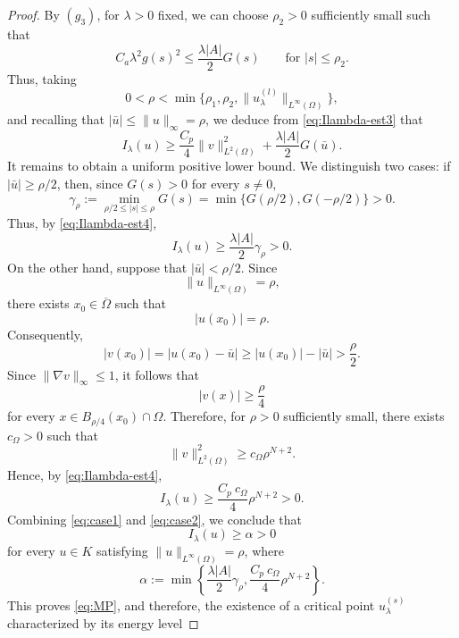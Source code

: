 \documentclass[11pt,reqno]{amsart}
\theoremstyle{plain}
\theoremstyle{definition}
\numberwithin{equation}{section}
\begin{document}
\begin{proof}
    By $(g_3)$, for $\lambda>0$ fixed, we can choose $\rho_2>0$ sufficiently small such that
    $$
        C_a\lambda^2g(s)^2
        \leq
        \frac{\lambda |A|}{2}G(s)
        \qquad\text{for } |s|\leq\rho_2.
    $$
    Thus, taking
    $$
        0<\rho<\min\{\rho_1,\rho_2, \|u_\lambda^{(l)}\|_{L^{\infty}(\Omega)}\},
    $$
    and recalling that $|\bar u|\leq\|u\|_\infty=\rho$, we deduce from
    \eqref{eq:Ilambda-est3} that
    \begin{equation}\label{eq:Ilambda-est4}
        I_\lambda(u)
        \geq
        \frac {C_p}4\|v\|_{L^2(\Omega)}^2
        +\frac{\lambda |A|}{2}G(\bar u).
    \end{equation}
    It remains to obtain a uniform positive lower bound. We distinguish
    two cases: if $|\bar u|\geq\rho/2$, then, since $G(s)>0$ for every $s\neq0$,
    $$
        \gamma_\rho:=
        \min_{\rho/2\leq |s|\leq\rho}G(s)= \min \{G(\rho/2), G(-\rho/2) \}>0.
    $$
    Thus, by \eqref{eq:Ilambda-est4},
    \begin{equation}\label{eq:case1}
        I_\lambda(u)
        \geq
        \frac{\lambda |A|}{2}\gamma_\rho>0.
    \end{equation}
    On the other hand, suppose that $|\bar u|<\rho/2$. Since
    $$
        \|u\|_{L^\infty(\Omega)}=\rho,
    $$
    there exists $x_0\in\overline{\Omega}$ such that
    $$
        |u(x_0)|=\rho.
    $$
    Consequently,
    $$
        |v(x_0)|
        =
        |u(x_0)-\bar u|
        \geq
        |u(x_0)|-|\bar u|
        >
        \frac{\rho}{2}.
    $$
    Since $\|\nabla v\|_\infty\leq1$, it follows that
    $$
        |v(x)|\geq\frac{\rho}{4}
    $$
    for every $x\in B_{\rho/4}(x_0)\cap\Omega$. Therefore, for $\rho>0$
    sufficiently small, there exists $c_\Omega>0$ such that
    $$
        \|v\|_{L^2(\Omega)}^2
        \geq
        c_\Omega\rho^{N+2}.
    $$
    Hence, by \eqref{eq:Ilambda-est4},
    \begin{equation}\label{eq:case2}
        I_\lambda(u)
        \geq
        \frac{C_p \ c_\Omega}{4}\rho^{N+2}>0.
    \end{equation}
    Combining \eqref{eq:case1} and \eqref{eq:case2}, we conclude that
    $$
        I_\lambda(u)\geq\alpha>0
    $$
    for every $u\in K$ satisfying
    $\|u\|_{L^\infty(\Omega)}=\rho$, where
    $$
        \alpha:=
        \min\left\{
        \frac{\lambda |A|}{2}\gamma_\rho,
        \frac{C_p \ c_\Omega}{4}\rho^{N+2}
        \right\}.
    $$
    This proves \eqref{eq:MP}, and therefore, the existence of a critical point $u_\lambda^{(s)}$ characterized by its energy level

\end{proof}
\end{document}
